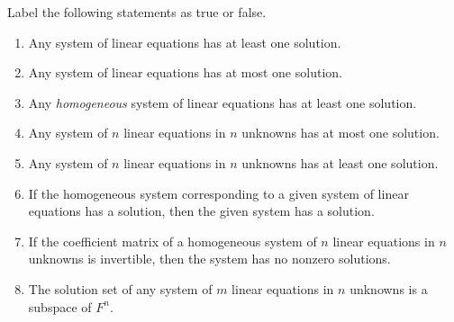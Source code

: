 \exercisesection

\begin{exercise} \label{exercise 3.3.1}
Label the following statements as true or false.
\begin{enumerate}
\item Any system of linear equations has at least one solution.
\item Any system of linear equations has at most one solution.
\item Any \emph{homogeneous} system of linear equations has at least one solution.
\item Any system of \(n\) linear equations in \(n\) unknowns has at most one solution.
\item Any system of \(n\) linear equations in \(n\) unknowns has at least one solution.
\item If the homogeneous system corresponding to a given system of linear equations has a solution, then the given system has a solution.
\item If the coefficient matrix of a homogeneous system of \(n\) linear equations in \(n\) unknowns is invertible, then the system has no nonzero solutions.
\item The solution set of any system of \(m\) linear equations in \(n\) unknowns is a subspace of \(F^n\).
\end{enumerate}
\end{exercise}

